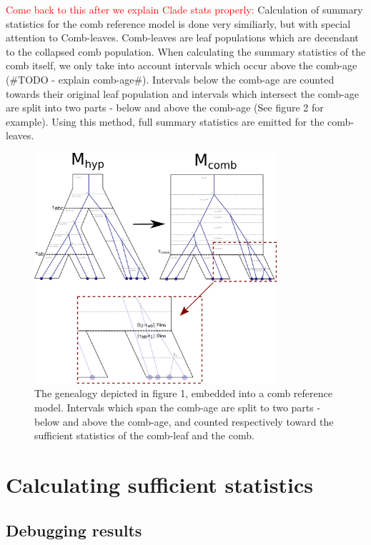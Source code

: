 \documentclass[11pt]{article}
\newcommand{\1}{\mathbbm{1}}
\begin{document}
\textcolor{red}{Come back to this after we explain Clade stats properly:} Calculation of summary statistics for the comb reference model is done very similiarly, but with special attention to Comb-leaves. Comb-leaves are leaf populations which are decendant to the collapsed comb population. When calculating the summary statistics of the comb itself, we only take into account intervals which occur above the comb-age (\#TODO - explain comb-age\#). Intervals below the comb-age are counted towards their original leaf population and intervals which intersect the comb-age are split into two parts - below and above the comb-age (See figure 2 for example). Using this method, full summary statistics are emitted for the comb-leaves.

\begin{figure}[h]
\centering
\includegraphics[width=0.8\textwidth]
{split_interval_on_comb_age}
\caption{The genealogy depicted in figure 1, embedded into a comb reference model. Intervals which span the comb-age are split to two parts - below and above the comb-age, and counted respectively toward the sufficient statistics of the comb-leaf and the comb.}
\label{fig:comb_collapse_and_split_interval}
\end{figure}

\section{Calculating sufficient statistics}


\subsection{Debugging results}
\end{document}
